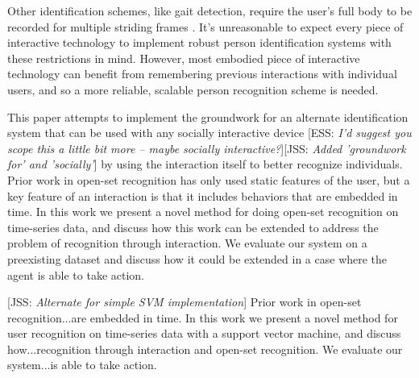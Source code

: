 \documentclass{article}
\newcommand{\elaine}[1]{{\textcolor[rgb]{0.1,0.4,0.6}{[ESS: {\it #1}]}}}
\newcommand{\meta}[1]{{\textcolor[rgb]{0.1,0.7,0.2}{[JSS: {\it #1}]}}}
\begin{document}
Other identification schemes, like gait detection, require the user's full body to be recorded for multiple striding frames \cite{liang_wang_silhouette_2003}\cite{han_individual_2006}. It's unreasonable to expect every piece of interactive technology to implement robust person identification systems with these restrictions in mind. However, most embodied piece of interactive technology can benefit from remembering previous interactions with individual users, and so a more reliable, scalable person recognition scheme is needed. 

This paper attempts to implement the groundwork for an alternate identification system that can be used with any socially interactive device \elaine{I'd suggest you scope this a little bit more -- maybe socially interactive?}\meta{Added 'groundwork for' and 'socially'} by using the interaction itself to better recognize individuals. Prior work in open-set recognition has only used static features of the user, but a key feature of an interaction is that it includes behaviors that are embedded in time. In this work we present a novel method for doing open-set recognition on time-series data, and discuss how this work can be extended to address the problem of recognition through interaction. We evaluate our system on a preexisting dataset and discuss how it could be extended in a case where the agent is able to take action. 

\meta{Alternate for simple SVM implementation}
Prior work in open-set recognition...are embedded in time. In this work we present a novel method for user recognition on time-series data with a support vector machine, and discuss how...recognition through interaction and open-set recognition. We evaluate our system...is able to take action. 



\end{document}
